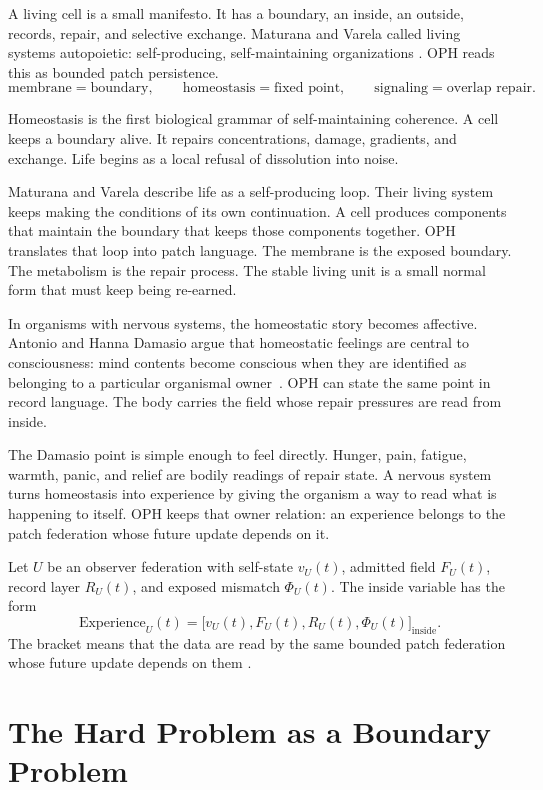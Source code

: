 \documentclass[11pt]{article}
\theoremstyle{remark}
\theoremstyle{plain}
\begin{document}
A living cell is a small manifesto. It has a boundary, an inside, an
outside, records, repair, and selective exchange. Maturana and Varela called
living systems autopoietic: self-producing, self-maintaining organizations
\cite{MaturanaVarela1980}. OPH reads this as bounded patch persistence.
\[
\boxed{
\text{membrane}=\text{boundary}, \qquad
\text{homeostasis}=\text{fixed point}, \qquad
\text{signaling}=\text{overlap repair}.
}
\]

Homeostasis is the first biological grammar of self-maintaining coherence. A
cell keeps a boundary alive. It repairs concentrations, damage, gradients, and
exchange. Life begins as a local refusal of dissolution into noise.

Maturana and Varela describe life as a self-producing loop. Their living system
keeps making the conditions of its own continuation.
A cell produces components that maintain the boundary that keeps those
components together. OPH translates that loop into patch language. The membrane
is the exposed boundary. The metabolism is the repair process. The stable living
unit is a small normal form that must keep being re-earned.

In organisms with nervous systems, the homeostatic story becomes affective.
Antonio and Hanna Damasio argue that homeostatic feelings are central to
consciousness: mind contents become conscious when they are identified as
belonging to a particular organismal owner~\cite{Damasio2023}. OPH can state
the same point in record language. The body carries the field whose repair
pressures are read from inside.

The Damasio point is simple enough to feel directly. Hunger, pain, fatigue,
warmth, panic, and relief are bodily readings of repair state. A nervous system
turns homeostasis into experience by giving the organism a way to read what is
happening to itself. OPH
keeps that owner relation: an experience belongs to the patch federation whose
future update depends on it.

Let \(U\) be an observer federation with self-state \(v_U(t)\), admitted field
\(F_U(t)\), record layer \(R_U(t)\), and exposed mismatch \(\Phi_U(t)\). The
inside variable has the form
\[
\mathrm{Experience}_U(t)=
\bigl[v_U(t),F_U(t),R_U(t),\Phi_U(t)\bigr]_{\mathrm{inside}}.
\]
The bracket means that the data are read by the same bounded patch federation
whose future update depends on them
\cite{OPHThinking,OPHConsciousness}.

\section{The Hard Problem as a Boundary Problem}
\end{document}
